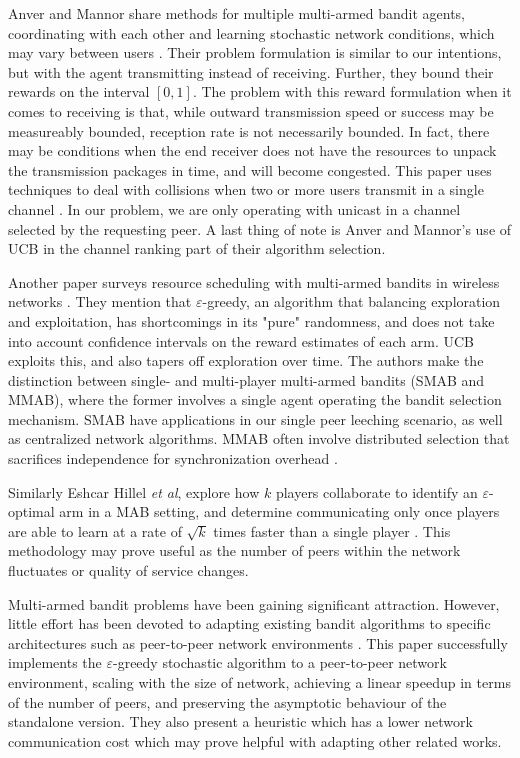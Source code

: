 \documentclass{article}
\begin{document}
Anver and Mannor share methods for multiple multi-armed bandit agents, coordinating with each other and learning stochastic network conditions, which may vary between 
users \cite{multiuser_mab}. Their problem formulation is similar to our intentions, but with the agent transmitting instead of receiving. Further, they bound their rewards 
on the interval $[0,1]$. The problem with this reward formulation when it comes to receiving is that, while outward transmission speed or success may be measureably bounded, 
reception rate is not necessarily bounded. In fact, there may be conditions when the end receiver does not have the resources to unpack the transmission packages in time, 
and will become congested. This paper uses techniques to deal with collisions when two or more users transmit in a single channel \cite{multiuser_mab}. In our problem, we 
are only operating with unicast in a channel selected by the requesting peer. A last thing of note is Anver and Mannor's use of UCB in the channel ranking part of their 
algorithm selection.

Another paper surveys resource scheduling with multi-armed bandits in wireless networks \cite{mab_wireless_scheduling_survey}. They mention that $\varepsilon$-greedy, an 
algorithm that balancing exploration and exploitation, has shortcomings in its "pure" randomness, and does not take into account confidence intervals on the reward estimates 
of each arm. UCB exploits this, and also tapers off exploration over time. The authors make the distinction between single- and multi-player multi-armed bandits (SMAB and 
MMAB), where the former involves a single agent operating the bandit selection mechanism. SMAB have applications in our single peer leeching scenario, as well as centralized 
network algorithms. MMAB often involve distributed selection that sacrifices independence for synchronization overhead \cite{mab_wireless_scheduling_survey}.

Similarly Eshcar Hillel \textit{et al}, explore how $k$ players collaborate to identify an $\varepsilon$-optimal arm in a MAB setting, and determine communicating only
once players are able to learn at a rate of $\sqrt{k}$ times faster than a single player \cite{mab_dist_exploration}. This methodology may prove useful as the number of 
peers within the network fluctuates or quality of service changes. 

Multi-armed bandit problems have been gaining significant attraction. However, little effort has been devoted to adapting existing bandit algorithms to specific architectures 
such as peer-to-peer network environments \cite{gossip_based_distrivuted_stochastic}. This paper successfully implements the $\varepsilon$-greedy stochastic algorithm to a 
peer-to-peer network environment, scaling with the size of network, achieving a linear speedup in terms of the number of peers, and preserving the asymptotic behaviour of the 
standalone version. They also present a heuristic which has a lower network communication cost which may prove helpful with adapting other related works. 
\end{document}
